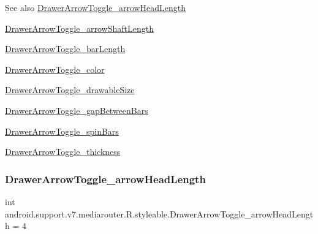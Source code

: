 \begin{DoxySeeAlso}{See also}
\hyperlink{classandroid_1_1support_1_1v7_1_1mediarouter_1_1R_1_1styleable_a54583b5b62def598121ead1148201937}{Drawer\+Arrow\+Toggle\+\_\+arrow\+Head\+Length} 

\hyperlink{classandroid_1_1support_1_1v7_1_1mediarouter_1_1R_1_1styleable_a0372ce9b69df23ee04c3dbddd6e5ddd3}{Drawer\+Arrow\+Toggle\+\_\+arrow\+Shaft\+Length} 

\hyperlink{classandroid_1_1support_1_1v7_1_1mediarouter_1_1R_1_1styleable_a2324cb3e0816358e8359cc591b432f3e}{Drawer\+Arrow\+Toggle\+\_\+bar\+Length} 

\hyperlink{classandroid_1_1support_1_1v7_1_1mediarouter_1_1R_1_1styleable_a8bd8d9885033bad0fe40599a324d5680}{Drawer\+Arrow\+Toggle\+\_\+color} 

\hyperlink{classandroid_1_1support_1_1v7_1_1mediarouter_1_1R_1_1styleable_a3312cfca0f8aa8b24370e5800a56eead}{Drawer\+Arrow\+Toggle\+\_\+drawable\+Size} 

\hyperlink{classandroid_1_1support_1_1v7_1_1mediarouter_1_1R_1_1styleable_a9ab9b13a15b2523a68b1fd3f98d047be}{Drawer\+Arrow\+Toggle\+\_\+gap\+Between\+Bars} 

\hyperlink{classandroid_1_1support_1_1v7_1_1mediarouter_1_1R_1_1styleable_aae8cdc41456778b50a759a297ff28dad}{Drawer\+Arrow\+Toggle\+\_\+spin\+Bars} 

\hyperlink{classandroid_1_1support_1_1v7_1_1mediarouter_1_1R_1_1styleable_afe1e37e12d66a5326cf5638f522e86fd}{Drawer\+Arrow\+Toggle\+\_\+thickness} 
\end{DoxySeeAlso}
\mbox{\label{classandroid_1_1support_1_1v7_1_1mediarouter_1_1R_1_1styleable_a54583b5b62def598121ead1148201937}} 
\subsubsection{\texorpdfstring{Drawer\+Arrow\+Toggle\+\_\+arrow\+Head\+Length}{DrawerArrowToggle\_arrowHeadLength}}
{\footnotesize\ttfamily int android.\+support.\+v7.\+mediarouter.\+R.\+styleable.\+Drawer\+Arrow\+Toggle\+\_\+arrow\+Head\+Length = 4\hspace{0.3cm}{\ttfamily [static]}}

